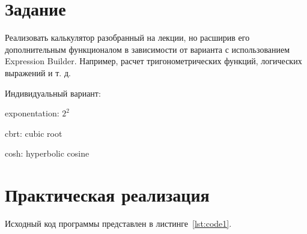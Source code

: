 \documentclass[a4paper, 14pt]{extarticle}
\begin{document}
\renewcommand{\ttdefault}{pcr}

\setlength{\tabcolsep}{3pt}
\newpage
\setcounter{page}{2}

\section{Задание}\label{Sect::task}

Реализовать калькулятор разобранный на лекции, но расширив его дополнительным функционалом в зависимости от варианта с использованием Expression Builder. Например, расчет тригонометрических функций, логических выражений и т. д.

Индивидуальный вариант:

exponentation: $2^2$

cbrt: cubic root

cosh: hyperbolic cosine

\section{Практическая реализация}\label{Sect::code}

Исходный код программы представлен в листинге~\ref{lst:code1}.
\end{document}
